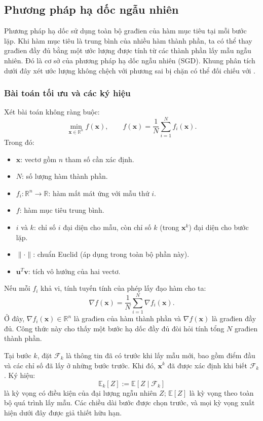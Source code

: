 \subsection{Phương pháp hạ dốc ngẫu nhiên}
\label{sec:sgd}
Phương pháp hạ dốc sử dụng toàn bộ građien của hàm mục tiêu tại mỗi bước lặp. Khi hàm mục tiêu là trung bình của nhiều hàm thành phần, ta có thể thay građien đầy đủ bằng một ước lượng được tính từ các thành phần lấy mẫu ngẫu nhiên. Đó là cơ sở của phương pháp hạ dốc ngẫu nhiên (SGD). Khung phân tích dưới đây xét ước lượng không chệch với phương sai bị chặn có thể đối chiếu với \cite{bottou2018optimization}.

\subsubsection{Bài toán tối ưu và các ký hiệu}
Xét bài toán không ràng buộc:
\begin{equation}
 \min_{\mathbf{x}\in\mathbb{R}^{n}}f(\mathbf{x}),
 \qquad f(\mathbf{x})=\frac{1}{N}\sum_{i=1}^{N}f_i(\mathbf{x}).
 \label{eq:sgd-objective}
\end{equation}
Trong đó:
\begin{itemize}
    \item $\mathbf{x}$: vectơ gồm $n$ tham số cần xác định.
    \item $N$: số lượng hàm thành phần.
    \item $f_i:\mathbb{R}^{n}\to\mathbb{R}$: hàm mất mát ứng với mẫu thứ $i$.
    \item $f$: hàm mục tiêu trung bình.
    \item $i$ và $k$: chỉ số $i$ đại diện cho mẫu, còn chỉ số $k$ (trong $\mathbf{x}^{k}$) đại diện cho bước lặp.
    \item $\|\cdot\|$: chuẩn Euclid (áp dụng trong toàn bộ phần này).
    \item $\mathbf{u}^{T}\mathbf{v}$: tích vô hướng của hai vectơ.
\end{itemize}
Nếu mỗi $f_i$ khả vi, tính tuyến tính của phép lấy đạo hàm cho ta:
\begin{equation}
     \nabla f(\mathbf{x})=\frac{1}{N}\sum_{i=1}^{N}\nabla f_i(\mathbf{x}).
     \label{eq:sgd-full-gradient}
\end{equation}
Ở đây, $\nabla f_i(\mathbf{x})\in\mathbb{R}^{n}$ là građien của hàm thành phần và $\nabla f(\mathbf{x})$ là građien đầy đủ. Công thức này cho thấy một bước hạ dốc đầy đủ đòi hỏi tính tổng $N$ građien thành phần.

Tại bước $k$, đặt $\mathcal{F}_k$ là thông tin đã có trước khi lấy mẫu mới, bao gồm điểm đầu và các chỉ số đã lấy ở những bước trước. Khi đó,
$\mathbf{x}^{k}$ đã được xác định khi biết $\mathcal{F}_k$.
Ký hiệu:
\[\mathbb{E}_k[Z]:=\mathbb{E}[Z\mid\mathcal{F}_k]\]
là kỳ vọng có điều kiện của đại lượng ngẫu nhiên $Z$; $\mathbb{E}[Z]$ là kỳ vọng theo toàn bộ quá trình lấy mẫu. Các chiều dài bước được chọn trước,
và mọi kỳ vọng xuất hiện dưới đây được giả thiết hữu hạn.

